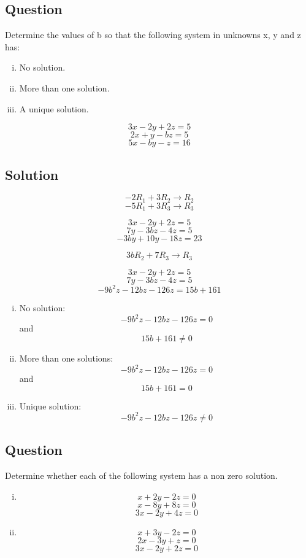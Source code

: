 \documentclass{book}
\begin{document}
\subsection{Question}

Determine the values of b so that the following system in unknowns x, y and z has:

\begin{enumerate}[i.]
	\item No solution.
	\item More than one solution.
	\item A unique solution.
\end{enumerate}

\[3x - 2y + 2z = 5\]
\[2x + y - bz = 5\]
\[5x - by - z = 16\]

\subsection*{Solution}

\[-2 R_1 + 3 R_2 \rightarrow R_2\]
\[-5 R_1 + 3 R_3 \rightarrow R_3\]

\[3x - 2y + 2z = 5\]
\[7y - 3bz - 4z = 5\]
\[-3by + 10y - 18z = 23\]

\[3b R_2 + 7 R_3 \rightarrow R_3\]

\[3x - 2y + 2z = 5\]
\[7y - 3bz - 4z = 5\]
\[- 9b^2z - 12bz - 126z = 15b + 161\]

\begin{enumerate}[i.]
	\item No solution:
		\[- 9b^2z - 12bz - 126z = 0\]
		and
		\[15b + 161 \ne 0\]

	\item More than one solutions:
		\[- 9b^2z - 12bz - 126z = 0\]
		and
		\[15b + 161 = 0\]

	\item Unique solution:
		\[- 9b^2z - 12bz - 126z \ne 0\]
\end{enumerate}

\subsection{Question}

Determine whether each of the following system has a non zero solution.

\begin{enumerate}[i.]
	\item \[x + 2y - 2z = 0\]
		\[x - 8y + 8z = 0\]
		\[3x - 2y + 4z = 0\]

	\item \[x + 3y - 2z = 0\]
		\[2x - 3y + z = 0\]
		\[3x - 2y + 2z = 0\]
\end{enumerate}
\end{document}
